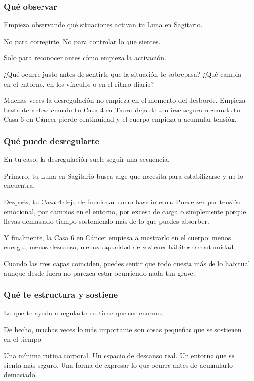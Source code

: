 \documentclass[11pt,a4paper]{article}
\begin{document}
\subsubsection*{Qué observar}

Empieza observando qué situaciones activan tu Luna en Sagitario.

No para corregirte.
No para controlar lo que sientes.

Solo para reconocer antes cómo empieza la activación.

¿Qué ocurre justo antes de sentirte que la situación te sobrepasa?
¿Qué cambia en el entorno, en los vínculos o en el ritmo diario?

Muchas veces la desregulación no empieza en el momento del desborde. Empieza bastante antes: cuando tu Casa 4 en Tauro deja de sentirse segura o cuando tu Casa 6 en Cáncer pierde continuidad y el cuerpo empieza a acumular tensión.

\subsubsection*{Qué puede desregularte}

En tu caso, la desregulación suele seguir una secuencia.

Primero, tu Luna en Sagitario busca algo que necesita para estabilizarse y no lo encuentra.

Después, tu Casa 4 deja de funcionar como base interna. Puede ser por tensión emocional, por cambios en el entorno, por exceso de carga o simplemente porque llevas demasiado tiempo sosteniendo más de lo que puedes absorber.

Y finalmente, la Casa 6 en Cáncer empieza a mostrarlo en el cuerpo:
menos energía,
menos descanso,
menos capacidad de sostener hábitos o continuidad.

Cuando las tres capas coinciden, puedes sentir que todo cuesta más de lo habitual aunque desde fuera no parezca estar ocurriendo nada tan grave.

\subsubsection*{Qué te estructura y sostiene}

Lo que te ayuda a regularte no tiene que ser enorme.

De hecho, muchas veces lo más importante son cosas pequeñas que se sostienen en el tiempo.

Una mínima rutina corporal.
Un espacio de descanso real.
Un entorno que se sienta más seguro.
Una forma de expresar lo que ocurre antes de acumularlo demasiado.
\end{document}
